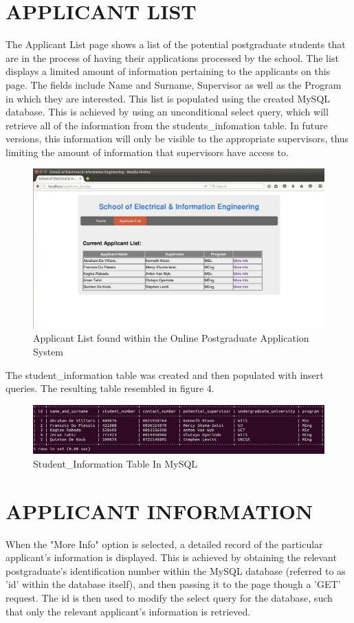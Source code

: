 \documentclass[journal,comsoc,onecolumn]{IEEEtran}
\begin{document}
\section{APPLICANT LIST}
The Applicant List page shows a list of the potential postgraduate students that are in the process of having their applications processed by the school. The list displays a limited amount of information pertaining to the applicants on this page. The fields include Name and Surname, Supervisor as well as the Program in which they are interested. This list is populated using the created MySQL database. This is achieved by using an unconditional select query, which will retrieve all of the information from the students\_infomation table. In future versions, this information will only be visible to the appropriate supervisors, thus limiting the amount of information that supervisors have access to. 
	
\begin{figure}[h]
	\centering
	\includegraphics[width=0.7\linewidth]{list}
	\caption{Applicant List found within the Online Postgraduate Application System}
	\label{fig:list}
\end{figure}
	
\hfill \break The student\_information table was created and then populated with insert queries. The resulting table resembled in figure 4.
	
\begin{figure}[h]
	\centering
	\includegraphics[width=0.7\linewidth]{mysql}
	\caption{Student\_Information Table In MySQL}
	\label{fig:mysql}
\end{figure}


\section{APPLICANT INFORMATION}
When the "More Info" option is selected, a detailed record of the particular applicant's information is displayed. This is achieved by obtaining the relevant postgraduate's identification number within the MySQL database (referred to as 'id' within the database itself), and then passing it to the page though a 'GET' request. The id is then used to modify the select query for the database, such that only the relevant applicant's information is retrieved.
	
\end{document}
